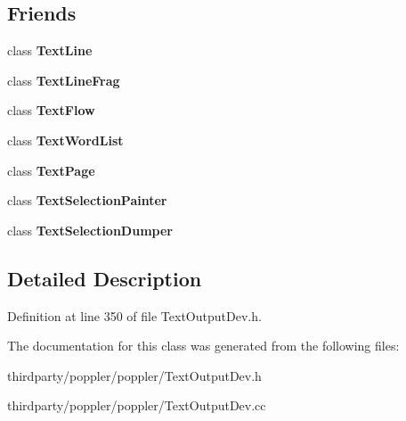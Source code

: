 \subsection*{Friends}
\begin{DoxyCompactItemize}
\item 
\mbox{\label{class_text_block_a47df881e8259564a58fb3a0f656e1c98}} 
class {\bfseries Text\+Line}
\item 
\mbox{\label{class_text_block_acb07d216fef09d9e1ff8e8029eb90bd3}} 
class {\bfseries Text\+Line\+Frag}
\item 
\mbox{\label{class_text_block_a013da25b06e986abc9b0f46aa906eae8}} 
class {\bfseries Text\+Flow}
\item 
\mbox{\label{class_text_block_ab6d080596abe41783ce85827de349c49}} 
class {\bfseries Text\+Word\+List}
\item 
\mbox{\label{class_text_block_aabfaf949a35dc7fec076efc8f20054a8}} 
class {\bfseries Text\+Page}
\item 
\mbox{\label{class_text_block_a478e1ac9857fe7ba0b2079ce49d24e78}} 
class {\bfseries Text\+Selection\+Painter}
\item 
\mbox{\label{class_text_block_af2dbf093feb7a4386dbeeb5bf5423f29}} 
class {\bfseries Text\+Selection\+Dumper}
\end{DoxyCompactItemize}


\subsection{Detailed Description}


Definition at line 350 of file Text\+Output\+Dev.\+h.



The documentation for this class was generated from the following files\+:\begin{DoxyCompactItemize}
\item 
thirdparty/poppler/poppler/Text\+Output\+Dev.\+h\item 
thirdparty/poppler/poppler/Text\+Output\+Dev.\+cc\end{DoxyCompactItemize}
